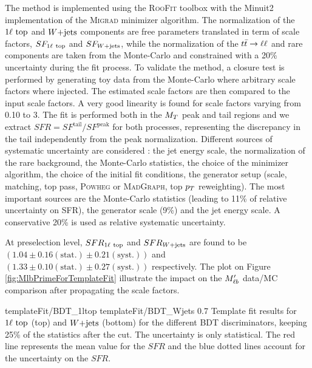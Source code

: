         The method is implemented using the \textsc{RooFit} toolbox with the Minuit2 implementation of the \textsc{Migrad} minimizer algorithm. The normalization of the $1\ell~\text{top}$ and $\text{$W$+jets}$ components are free parameters translated in term of scale factors, $SF_{1\ell~\text{top}}$ and $SF_{\text{$W$+jets}}$, while the normalization of the $t\bar{t} \rightarrow \ell \ell$ and rare components are taken from the Monte-Carlo and constrained with a 20\% uncertainty during the fit process. To validate the method, a closure test is performed by generating toy data from the Monte-Carlo where arbitrary scale factors where injected. The estimated scale factors are then compared to the input scale factors. A very good linearity is found for scale factors varying from 0.10 to 3. The fit is performed both in the $M_T$ peak and tail regions and we extract $SFR = SF^{\text{tail}} / SF^{\text{peak}}$ for both processes, representing the discrepancy in the tail independently from the peak normalization. Different sources of systematic uncertainty are considered : the jet energy scale, the normalization of the rare background, the Monte-Carlo statistics, the choice of the minimizer algorithm, the choice of the initial fit conditions, the generator setup (scale, matching, top pass, \textsc{Powheg} or \textsc{MadGraph}, top $p_T$ reweighting). The most important sources are the Monte-Carlo statistics (leading to 11\% of relative uncertainty on SFR), the generator scale (9\%) and the jet energy scale. A conservative 20\% is used as relative systematic uncertainty.

        At preselection level, $SFR_{1\ell~\text{top}}$ and $SFR_{\text{$W$+jets}}$ are found to be $(1.04 \pm 0.16 (\text{stat.}) \pm 0.21 (\text{syst.}))$ and $(1.33 \pm 0.10 (\text{stat.}) \pm 0.27 (\text{syst.}) )$ respectively. The plot on Figure \ref{fig:MlbPrimeForTemplateFit} illustrate the impact on the $M'_{\ell b}$ data/MC comparison after propagating the scale factors.


                          {templateFit/BDT_1ltop}
                          {templateFit/BDT_Wjets}
                          {0.7}
                          {Template fit results for $1\ell~\text{top}$ (top) and $\text{$W$+jets}$ (bottom) for the different BDT discriminators, keeping 25\% of the statistics after the cut. The uncertainty is only statistical. The red line represents the mean value for the $SFR$ and the blue dotted lines account for the uncertainty on the $SFR$.}

